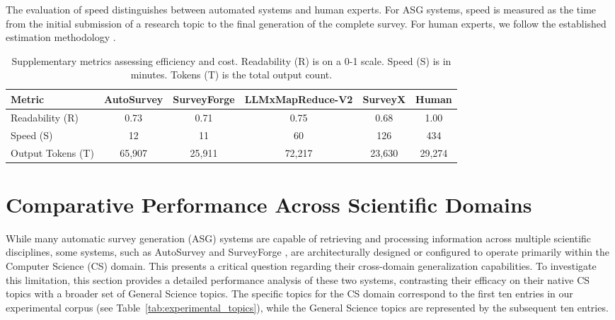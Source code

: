 \documentclass[11pt]{article}
\begin{document}
The evaluation of speed distinguishes between automated systems and human experts. For ASG systems, speed is measured as the time from the initial submission of a research topic to the final generation of the complete survey. For human experts, we follow the established estimation methodology \cite{wang2024autosurvey}.

\begin{table}[h!]
    \centering
    \caption{Supplementary metrics assessing efficiency and cost. Readability (R) is on a 0-1 scale. Speed (S) is in minutes. Tokens (T) is the total output count.}
    \label{tab:appendix_supplementary}
    \begin{tabular}{lccccc}
        \toprule
        \textbf{Metric} & \textbf{AutoSurvey} & \textbf{SurveyForge} & \textbf{LLMxMapReduce-V2} & \textbf{SurveyX} & \textbf{Human} \\
        \midrule
        Readability (R) & 0.73 & 0.71 & 0.75 & 0.68 & 1.00 \\
        Speed (S) & 12 & 11 & 60 & 126 & 434 \\
        Output Tokens (T) & 65,907 & 25,911 & 72,217 & 23,630 & 29,274 \\
        \bottomrule
    \end{tabular}
\end{table}




\section{Comparative Performance Across Scientific Domains}
\label{sec:appendix_domain_comparison}

While many automatic survey generation (ASG) systems are capable of retrieving and processing information across multiple scientific disciplines, some systems, such as AutoSurvey \citep{wang2024autosurvey} and SurveyForge \citep{yan2025surveyforge}, are architecturally designed or configured to operate primarily within the Computer Science (CS) domain. This presents a critical question regarding their cross-domain generalization capabilities. To investigate this limitation, this section provides a detailed performance analysis of these two systems, contrasting their efficacy on their native CS topics with a broader set of General Science topics. The specific topics for the CS domain correspond to the first ten entries in our experimental corpus (see Table~\ref{tab:experimental_topics}), while the General Science topics are represented by the subsequent ten entries.
\end{document}
